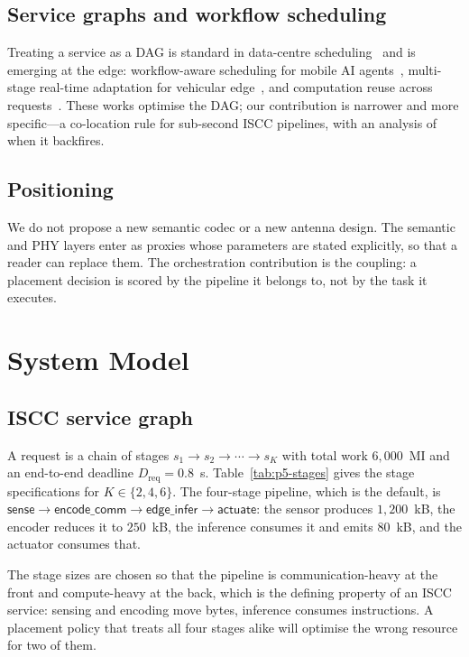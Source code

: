 \documentclass[journal,10pt]{IEEEtran}
\newcommand{\stage}[1]{\textsf{#1}}
\begin{document}
\subsection{Service graphs and workflow scheduling}
Treating a service as a DAG is standard in data-centre
scheduling~\cite{kwon2023vllm} and is emerging at the edge: workflow-aware
scheduling for mobile AI agents~\cite{he2026workflow}, multi-stage real-time
adaptation for vehicular edge~\cite{kumar2026multistage}, and computation reuse
across requests~\cite{he2026reuse}. These works optimise the DAG; our
contribution is narrower and more specific---a co-location rule for sub-second
ISCC pipelines, with an analysis of when it backfires.

\subsection{Positioning}
We do not propose a new semantic codec or a new antenna design. The semantic
and PHY layers enter as proxies whose parameters are stated explicitly, so that
a reader can replace them. The orchestration contribution is the coupling: a
placement decision is scored by the pipeline it belongs to, not by the task it
executes.

\section{System Model}
\label{sec:model}

\subsection{ISCC service graph}
A request is a chain of stages $s_1\to s_2\to\cdots\to s_K$ with total work
$6{,}000$~MI and an end-to-end deadline $D_{\text{req}}=0.8$~s. Table~\ref{tab:p5-stages}
gives the stage specifications for $K\in\{2,4,6\}$. The four-stage pipeline,
which is the default, is $\stage{sense}\to\stage{encode\_comm}\to
\stage{edge\_infer}\to\stage{actuate}$: the sensor produces $1{,}200$~kB,
the encoder reduces it to $250$~kB, the inference consumes it and emits
$80$~kB, and the actuator consumes that.



The stage sizes are chosen so that the pipeline is communication-heavy at the
front and compute-heavy at the back, which is the defining property of an ISCC
service: sensing and encoding move bytes, inference consumes instructions. A
placement policy that treats all four stages alike will optimise the wrong
resource for two of them.
\end{document}
